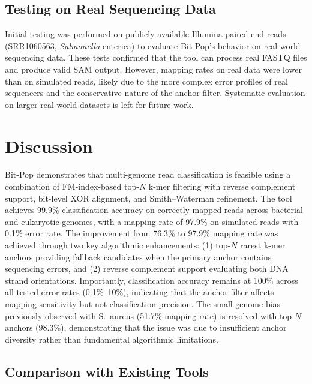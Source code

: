 \documentclass[10pt]{article}
\begin{document}
\subsection{Testing on Real Sequencing Data}

Initial testing was performed on publicly available Illumina paired-end reads (SRR1060563, \textit{Salmonella} enterica) to evaluate Bit-Pop's behavior on real-world sequencing data. These tests confirmed that the tool can process real FASTQ files and produce valid SAM output. However, mapping rates on real data were lower than on simulated reads, likely due to the more complex error profiles of real sequencers and the conservative nature of the anchor filter. Systematic evaluation on larger real-world datasets is left for future work.

\section{Discussion}

Bit-Pop demonstrates that multi-genome read classification is feasible using a combination of FM-index-based top-$N$ k-mer filtering with reverse complement support, bit-level XOR alignment, and Smith--Waterman refinement. The tool achieves 99.9\% classification accuracy on correctly mapped reads across bacterial and eukaryotic genomes, with a mapping rate of 97.9\% on simulated reads with 0.1\% error rate. The improvement from 76.3\% to 97.9\% mapping rate was achieved through two key algorithmic enhancements: (1) top-$N$ rarest k-mer anchors providing fallback candidates when the primary anchor contains sequencing errors, and (2) reverse complement support evaluating both DNA strand orientations. Importantly, classification accuracy remains at 100\% across all tested error rates (0.1\%--10\%), indicating that the anchor filter affects mapping sensitivity but not classification precision. The small-genome bias previously observed with S.~aureus (51.7\% mapping rate) is resolved with top-$N$ anchors (98.3\%), demonstrating that the issue was due to insufficient anchor diversity rather than fundamental algorithmic limitations.

\subsection{Comparison with Existing Tools}
\end{document}
